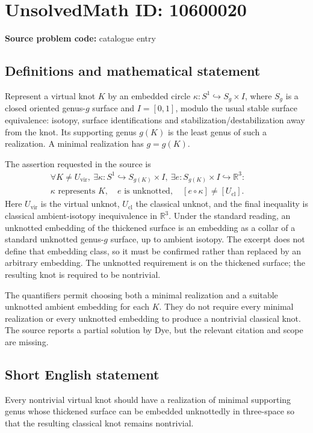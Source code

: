 \documentclass[11pt]{article}
\newcommand{\R}{\mathbb{R}}
\begin{document}
\section*{UnsolvedMath ID: 10600020}
\textbf{Source problem code:} catalogue entry
\subsection{Definitions and mathematical statement}
Represent a virtual knot \(K\) by an embedded circle \(\kappa:S^1\hookrightarrow S_g\times I\), where \(S_g\) is a closed oriented genus-\(g\) surface and \(I=[0,1]\), modulo the usual stable surface equivalence: isotopy, surface identifications and stabilization/destabilization away from the knot. Its supporting genus \(g(K)\) is the least genus of such a realization. A minimal realization has \(g=g(K)\).

The assertion requested in the source is
\[\begin{split}
\forall K\ne U_{\mathrm{vir}},\ \exists\kappa:S^1\hookrightarrow S_{g(K)}\times I,\
\exists e:S_{g(K)}\times I\hookrightarrow\R^3:\qquad\\
\kappa\text{ represents }K,\quad e\text{ is unknotted},\quad
[e\circ\kappa]\ne[U_{\mathrm{cl}}].
\end{split}\]
Here \(U_{\mathrm{vir}}\) is the virtual unknot, \(U_{\mathrm{cl}}\) the classical unknot, and the final inequality is classical ambient-isotopy inequivalence in \(\R^3\). Under the standard reading, an unknotted embedding of the thickened surface is an embedding as a collar of a standard unknotted genus-\(g\) surface, up to ambient isotopy. The excerpt does not define that embedding class, so it must be confirmed rather than replaced by an arbitrary embedding. The unknotted requirement is on the thickened surface; the resulting knot is required to be nontrivial.

The quantifiers permit choosing both a minimal realization and a suitable unknotted ambient embedding for each \(K\). They do not require every minimal realization or every unknotted embedding to produce a nontrivial classical knot. The source reports a partial solution by Dye, but the relevant citation and scope are missing.
\subsection{Short English statement}
Every nontrivial virtual knot should have a realization of minimal supporting genus whose thickened surface can be embedded unknottedly in three-space so that the resulting classical knot remains nontrivial.
\end{document}
